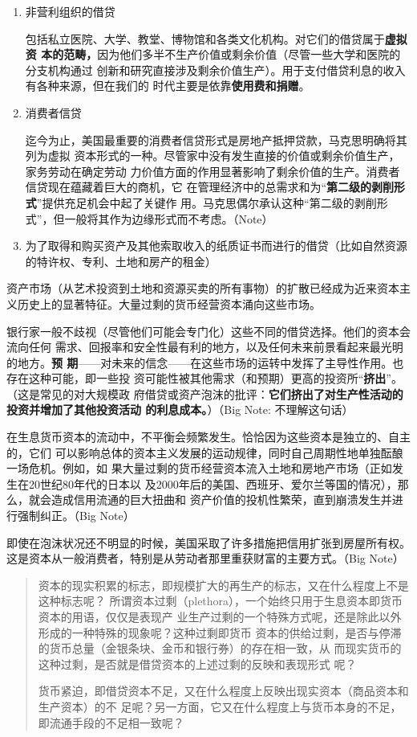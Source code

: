 \begin{enumerate}
\item 非营利组织的借贷

  包括私立医院、大学、教堂、博物馆和各类文化机构。对它们的借贷属于\textbf{虚拟资
    本的范畴，}因为他们多半不生产价值或剩余价值（尽管一些大学和医院的分支机构通过
  创新和研究直接涉及剩余价值生产）。用于支付借贷利息的收入有各种来源，但在我们的
  时代主要是依靠\textbf{使用费和捐赠}。

  \item 消费者信贷

    迄今为止，美国最重要的消费者信贷形式是房地产抵押贷款，马克思明确将其列为虚拟
    资本形式的一种。尽管家中没有发生直接的价值或剩余价值生产，家务劳动在确定劳动
    力价值方面的作用显著影响了剩余价值的生产。消费者信贷现在蕴藏着巨大的商机，它
    在管理经济中的总需求和为“\textbf{第二级的剥削形式}”提供充足机会中起了关键作
    用。马克思偶尔承认这种“第二级的剥削形式”，但一般将其作为边缘形式而不考虑。（Note）
   \item 为了取得和购买资产及其他索取收入的纸质证书而进行的借贷（比如自然资源的特许权、专利、土地和房产的租金）

\end{enumerate}

\bigskip
资产市场（从艺术投资到土地和资源买卖的所有事物）的扩散已经成为近来资本主义历史上的显著特征。大量过剩的货币经营资本涌向这些市场。


银行家一般不歧视（尽管他们可能会专门化）这些不同的借贷选择。他们的资本会流向任何
需求、回报率和安全性最有利的地方，以及任何未来前景看起来最光明的地方。\textbf{预
  期}——对未来的信念——在这些市场的运转中发挥了主导性作用。也存在这种可能，即一些投
资可能性被其他需求（和预期）更高的投资所“\textbf{挤出}”。（这是常见的对大规模政
府借贷或资产泡沫的批评：\textbf{它们挤出了对生产性活动的投资并增加了其他投资活动
  的利息成本。}）（Big Note: 不理解这句话）

在生息货币资本的流动中，不平衡会频繁发生。恰恰因为这些资本是独立的、自主的，它们
可以影响总体的资本主义发展的运动规律，同时自己周期性地单独酝酿一场危机。例如，如
果大量过剩的货币经营资本流入土地和房地产市场（正如发生在20世纪80年代的日本以
及2000年后的美国、西班牙、爱尔兰等国的情况），那么，就会造成信用流通的巨大扭曲和
资产价值的投机性繁荣，直到崩溃发生并进行强制纠正。（Big Note）

即使在泡沫状况还不明显的时候，美国采取了许多措施把信用扩张到房屋所有权。这是资本从一般消费者，特别是从劳动者那里重获财富的主要方式。（Big Note）

\begin{quotation}
  资本的现实积累的标志，即规模扩大的再生产的标志，又在什么程度上不是这种标志呢？
  所谓资本过剩（plethora），一个始终只用于生息资本即货币资本的用语，仅仅是表现产
  业生产过剩的一个特殊方式呢，还是除此以外形成的一种特殊的现象呢？这种过剩即货币
  资本的供给过剩，是否与停滞的货币总量（金银条块、金币和银行券）的存在相一致，从
  而现实货币的这种过剩，是否就是借贷资本的上述过剩的反映和表现形式
  呢？

货币紧迫，即借贷资本不足，又在什么程度上反映出现实资本（商品资本和生产资本）的不
足呢？另一方面，它又在什么程度上与货币本身的不足，即流通手段的不足相一致呢？
\end{quotation}

